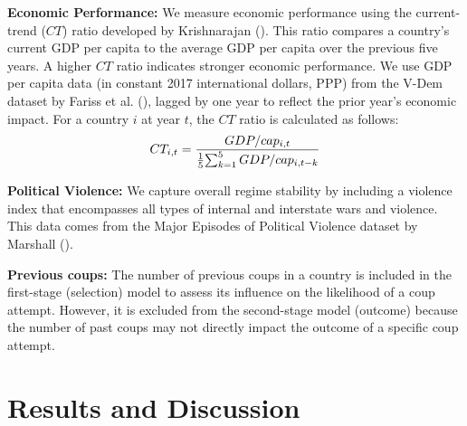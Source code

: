 \documentclass[
  12pt,
]{report}
\begin{document}
\textbf{Economic Performance:} We measure economic performance using the
current-trend (\(CT\)) ratio developed by Krishnarajan
(). This ratio compares a country's
current GDP per capita to the average GDP per capita over the previous
five years. A higher \(CT\) ratio indicates stronger economic
performance. We use GDP per capita data (in constant 2017 international
dollars, PPP) from the V-Dem dataset by Fariss et al.
(), lagged by one year to reflect the
prior year's economic impact. For a country \(i\) at year \(t\), the
\(CT\) ratio is calculated as follows: \[
\begin{aligned}
CT_{i,t} = {GDP/cap_{i,t} \over {1 \over 5} {\sum_{k=1}^5GDP/cap_{i,t-k}}}
\end{aligned}
\]

\textbf{Political Violence:} We capture overall regime stability by
including a violence index that encompasses all types of internal and
interstate wars and violence. This data comes from the Major Episodes of
Political Violence dataset by Marshall
().

\textbf{Previous coups:} The number of previous coups in a country is
included in the first-stage (selection) model to assess its influence on
the likelihood of a coup attempt. However, it is excluded from the
second-stage model (outcome) because the number of past coups may not
directly impact the outcome of a specific coup attempt.

\section{Results and Discussion}\label{results-and-discussion}
\end{document}
